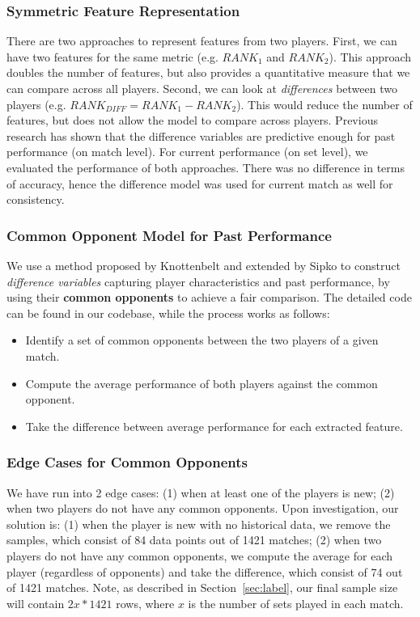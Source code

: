 \documentclass[paper=a4, fontsize=10pt]{scrartcl} %
\numberwithin{equation}{section} %
\numberwithin{figure}{section} %
\numberwithin{table}{section} %
\begin{document}
\subsubsection{Symmetric Feature Representation}
There are two approaches to represent features from two players.  First, we can have two features for the same metric (e.g. $RANK_1$ and $RANK_2$).  This approach doubles the number of features, but also provides a quantitative measure that we can compare across all players.  Second, we can look at \textit{differences} between two players (e.g. $RANK_{DIFF} = RANK_1 - RANK_2$).  This would reduce the number of features, but does not allow the model to compare across players.  Previous research has shown that the difference variables are predictive enough \cite{tennis1} \cite{omalley} for past performance (on match level).  For current performance (on set level), we evaluated the performance of both approaches. There was no difference in terms of accuracy, hence the difference model was used for current match as well for consistency.
\subsubsection{Common Opponent Model for Past Performance}
We use a method proposed by Knottenbelt \cite{KNOTTENBELT20123820} and extended by Sipko \cite{tennis1} to construct \textit{difference variables} capturing player characteristics and past performance, by using their \textbf{common opponents} to achieve a fair comparison. The detailed code can be found in our codebase, while the process works as follows: 
\begin{itemize}
\item Identify a set of common opponents between the two players of a given match.
\item Compute the average performance of both players against the common opponent.
\item Take the difference between average performance for each extracted feature.
\end{itemize}
\subsubsection{Edge Cases for Common Opponents}
We have run into 2 edge cases: (1) when at least one of the players is new; (2) when two players do not have any common opponents. Upon investigation, our solution is: (1) when the player is new with no historical data, we remove the samples, which consist of 84 data points out of 1421 matches; (2) when two players do not have any common opponents, we compute the average for each player (regardless of opponents) and take the difference, which consist of 74 out of 1421 matches. Note, as described in Section~\ref{sec:label}, our final sample size will contain $2x * 1421$ rows, where $x$ is the number of sets played in each match.
\end{document}
